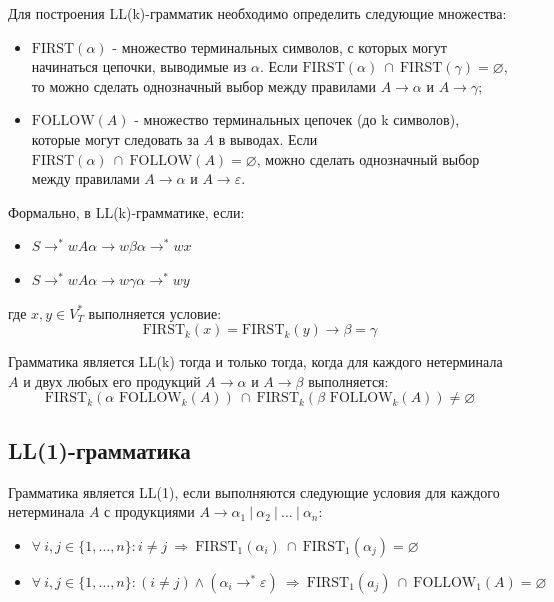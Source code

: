 \documentclass[a4paper,final]{article}
\begin{document}
Для построения LL(k)-грамматик необходимо определить следующие множества:
\begin{itemize}
    \item $\text{FIRST}(\alpha)$ - множество терминальных символов, с которых могут начинаться цепочки, выводимые из $\alpha$. Если $\text{FIRST}(\alpha) ~\cap~ \text{FIRST}(\gamma) = \varnothing$, то можно сделать однозначный выбор между правилами $A \rightarrow \alpha$ и $A \rightarrow \gamma$;
    \item $\text{FOLLOW}(A)$ - множество терминальных цепочек (до k символов), которые могут следовать за $A$ в выводах. Если $\text{FIRST}(\alpha) ~\cap~ \text{FOLLOW}(A) = \varnothing$, можно сделать однозначный выбор между правилами $A \rightarrow \alpha$ и $A \rightarrow \varepsilon$.
\end{itemize}

Формально, в LL(k)-грамматике, если:
\begin{itemize}
    \item $S \rightarrow^* w A\alpha \rightarrow w\beta\alpha \rightarrow^* wx $
    \item $S \rightarrow^* w A\alpha \rightarrow w\gamma\alpha \rightarrow^* wy $
\end{itemize}
где $x, y \in V_T^*$ выполняется условие:$$\text{FIRST}_k(x) = \text{FIRST}_k(y) \rightarrow \beta = \gamma$$

Грамматика является LL(k) тогда и только тогда, когда для каждого нетерминала $A$ и двух любых его продукций $A \rightarrow \alpha$ и $A \rightarrow \beta$ выполняется:$$\text{FIRST}_k(\alpha \text{ FOLLOW}_k(A)) ~\cap~ \text{FIRST}_k(\beta \text{ FOLLOW}_k(A)) \neq \varnothing$$



\subsection{LL(1)-грамматика}
Грамматика является LL(1), если выполняются следующие условия для каждого нетерминала $A$ с продукциями $A \rightarrow \alpha_1 ~|~\alpha_2 ~|~ \dots ~|~ \alpha_n$:
\begin{itemize}
    \item $\forall~ i, j \in \{1, \dots, n\}: i \neq j ~\Rightarrow~\text{FIRST}_1(\alpha_i) ~\cap~ \text{FIRST}_1(\alpha_j) = \varnothing$
    \item $\forall~ i, j \in \{1, \dots, n\}: (i \neq j) \land (\alpha_i \rightarrow^* \varepsilon) ~\Rightarrow~ \text{FIRST}_1(a_j) ~\cap~ \text{FOLLOW}_1(A) = \varnothing $
\end{itemize}
\end{document}
